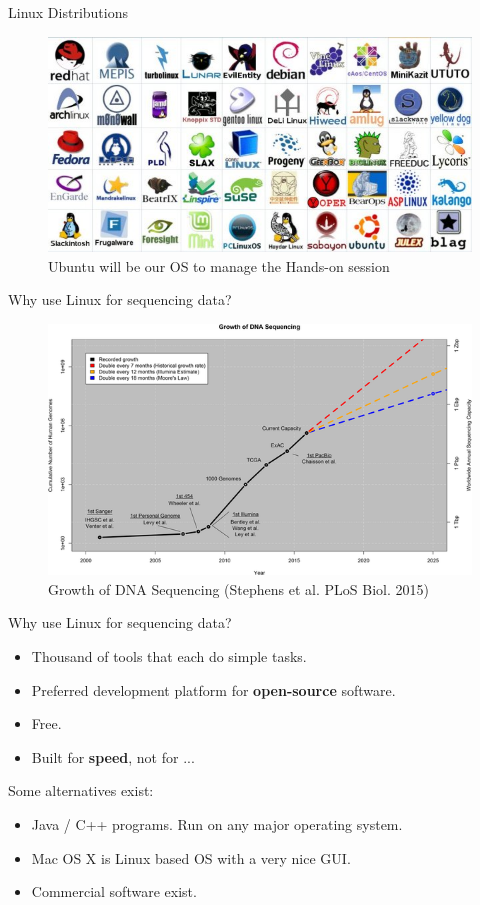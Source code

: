 \documentclass{if-beamer}
\begin{document}
\begin{frame}{Linux Distributions}
\begin{figure}
\centering
\includegraphics[scale=0.5]{linux_distros.jpg}
\caption{Ubuntu will be our OS to manage the Hands-on session}
\end{figure}
\end{frame}
\begin{frame}{Why use Linux for sequencing data?}
\begin{figure}
\centering
\includegraphics[scale=2]{linux_plois.PNG}
\caption{Growth of DNA Sequencing (Stephens et al. PLoS Biol. 2015)}
\end{figure}
\end{frame}
\begin{frame}{Why use Linux for sequencing data?}
\begin{large}
\begin{itemize}
    \item Thousand of tools that each do simple tasks.
    \item Preferred development platform for \textbf{open-source} software.
    \item Free.
    \item Built for \textbf{speed}, not for ...
\end{itemize}
Some alternatives exist:
\begin{itemize}
    \item Java / C++ programs. Run on any major operating system.
    \item Mac OS X is Linux based OS with a very nice GUI.
    \item Commercial software exist.
\end{itemize}
\end{large}
\end{frame}
\end{document}

